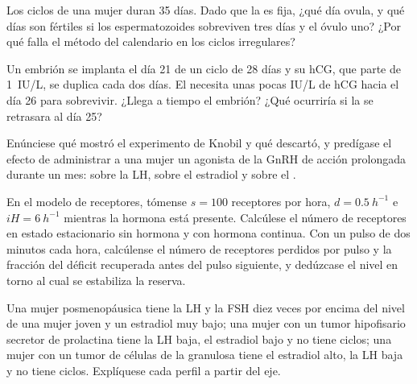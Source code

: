 \begin{exercise}[$\star\star$]\label{exo:b2:reproductive-hormones:7}
Los ciclos de una mujer duran 35 días. Dado que la  es fija,
¿qué día ovula, y qué días son fértiles si los espermatozoides sobreviven
tres días y el óvulo uno? ¿Por qué falla el método del calendario en los
ciclos irregulares?
\end{exercise}

\begin{exercise}[$\star\star$]\label{exo:b2:reproductive-hormones:8}
Un embrión se implanta el día 21 de un ciclo de 28 días y su hCG, que
parte de \qty{1}{IU/L}, se duplica cada dos días. El  necesita
unas pocas IU/L de hCG hacia el día 26 para sobrevivir. ¿Llega a tiempo
el embrión? ¿Qué ocurriría si la  se retrasara al día 25?
\end{exercise}

\begin{exercise}[$\star\star$]\label{exo:b2:reproductive-hormones:9}
Enúnciese qué mostró el experimento de Knobil y qué descartó, y
predígase el efecto de administrar a una mujer un agonista de la GnRH de
acción prolongada durante un mes: sobre la LH, sobre el estradiol y
sobre el .
\end{exercise}

\begin{exercise}[$\star\star\star$]\label{exo:b2:reproductive-hormones:10}
En el modelo de receptores, tómense $s = 100$ receptores por hora, $d =
\qty{0.5}{h^{-1}}$ e $iH = \qty{6}{h^{-1}}$ mientras la hormona está
presente. Calcúlese el número de receptores en estado estacionario sin
hormona y con hormona continua. Con un pulso de dos minutos cada hora,
calcúlense el número de receptores perdidos por pulso y la fracción del
déficit recuperada antes del pulso siguiente, y dedúzcase el nivel en
torno al cual se estabiliza la reserva.
\end{exercise}

\begin{exercise}[$\star\star\star$]\label{exo:b2:reproductive-hormones:11}
Una mujer posmenopáusica tiene la LH y la FSH diez veces por encima del
nivel de una mujer joven y un estradiol muy bajo; una mujer con un tumor
hipofisario secretor de prolactina tiene la LH baja, el estradiol bajo y
no tiene ciclos; una mujer con un tumor de células de la granulosa tiene
el estradiol alto, la LH baja y no tiene ciclos. Explíquese cada perfil a
partir del eje.
\end{exercise}

